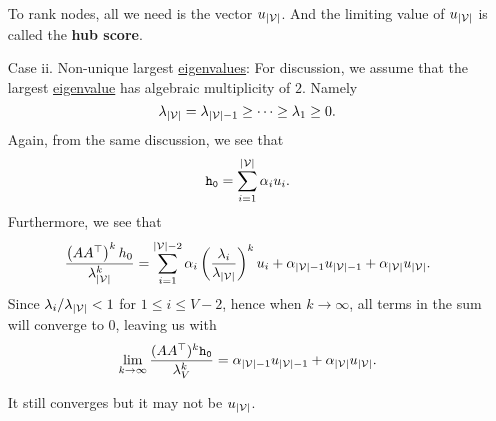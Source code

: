 \begin{enumerate}
		\begin{remark}
			To rank nodes, all we need is the vector \(u_{\left\vert \mathcal{\MakeUppercase{v}} \right\vert }\).
			And the limiting value of \(u_{\left\vert \mathcal{\MakeUppercase{v}} \right\vert }\) is called the \textbf{hub score}.
		\end{remark}
	\item[Case ii.] Non-unique largest \hyperref[def:eigenvalue]{eigenvalues}: For discussion, we assume that the largest \hyperref[def:eigenvalue]{eigenvalue} has algebraic multiplicity of \(2\). Namely
		\[
			\lambda_{\left\vert \mathcal{\MakeUppercase{v}} \right\vert } = \lambda_{\left\vert \mathcal{\MakeUppercase{v}} \right\vert -1} \geq \cdots \geq \lambda_{1}\geq 0.
		\]
		Again, from the same discussion, we see that
		\[
			\mathtt{h_{0}} = \sum\limits_{i=1}^{\left\vert \mathcal{\MakeUppercase{v}} \right\vert } \alpha_{i}u_{i}.
		\]
		Furthermore, we see that
		\[
			\frac{\left(A A^{\top}\right)^k h_0}{\lambda_{\left\vert \mathcal{\MakeUppercase{v}} \right\vert }^k}
			= \sum\limits_{i=1}^{\left\vert \mathcal{\MakeUppercase{v}} \right\vert - 2} \alpha_{i}\left(\frac{\lambda_{i}}{\lambda_{\left\vert \mathcal{\MakeUppercase{v}} \right\vert }}\right)^k u_{i}
			+ \alpha_{\left\vert \mathcal{\MakeUppercase{v}} \right\vert -1}u_{\left\vert \mathcal{\MakeUppercase{v}} \right\vert -1}+\alpha_{\left\vert \mathcal{\MakeUppercase{v}} \right\vert } u_{\left\vert \mathcal{\MakeUppercase{v}} \right\vert }.
		\]
		Since \(\lambda_{i}/\lambda_{\left\vert \mathcal{\MakeUppercase{v}} \right\vert }< 1\) for \(1\leq i\leq V-2\), hence when \(k\to \infty \), all terms in the sum will converge to \(0\), leaving us with
		\[
			\lim_{k \to \infty} \frac{(A A^{\top})^{k}\mathtt{h_0}}{\lambda_V^k} = \alpha_{\left\vert \mathcal{\MakeUppercase{v}} \right\vert -1}u_{\left\vert \mathcal{\MakeUppercase{v}} \right\vert -1}
			+ \alpha_{\left\vert \mathcal{\MakeUppercase{v}} \right\vert } u_{\left\vert \mathcal{\MakeUppercase{v}} \right\vert }.
		\]
		\begin{remark}
			It still converges but it may not be \(u_{\left\vert \mathcal{\MakeUppercase{v}} \right\vert }\).
		\end{remark}
\end{enumerate}



